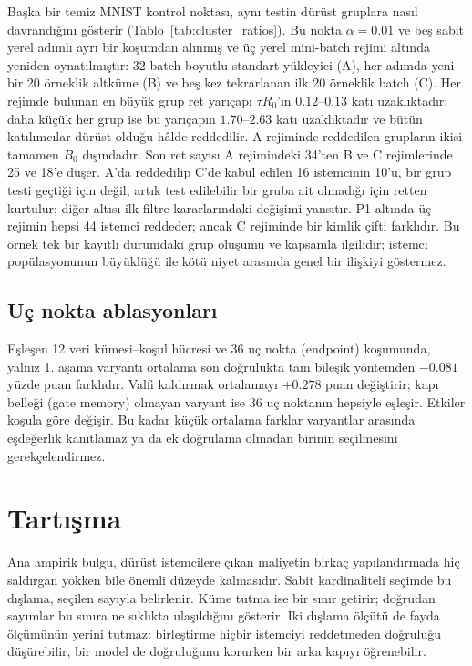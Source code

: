\documentclass[journal]{IEEEtran}
\begin{document}

Başka bir temiz MNIST kontrol noktası, aynı testin dürüst gruplara nasıl davrandığını gösterir (Tablo~\ref{tab:cluster_ratios}). Bu nokta $\alpha=0.01$ ve beş sabit yerel adımlı ayrı bir koşumdan alınmış ve üç yerel mini-batch rejimi altında yeniden oynatılmıştır: 32 batch boyutlu standart yükleyici (A), her adımda yeni bir 20 örneklik altküme (B) ve beş kez tekrarlanan ilk 20 örneklik batch (C). Her rejimde bulunan en büyük grup ret yarıçapı $\tau R_0$'ın $0.12$--$0.13$ katı uzaklıktadır; daha küçük her grup ise bu yarıçapın $1.70$--$2.63$ katı uzaklıktadır ve bütün katılımcılar dürüst olduğu hâlde reddedilir. A rejiminde reddedilen grupların ikisi tamamen $B_0$ dışındadır. Son ret sayısı A rejimindeki 34'ten B ve C rejimlerinde 25 ve 18'e düşer. A'da reddedilip C'de kabul edilen 16 istemcinin 10'u, bir grup testi geçtiği için değil, artık test edilebilir bir gruba ait olmadığı için retten kurtulur; diğer altısı ilk filtre kararlarındaki değişimi yansıtır. P1 altında üç rejimin hepsi 44 istemci reddeder; ancak C rejiminde bir kimlik çifti farklıdır. Bu örnek tek bir kayıtlı durumdaki grup oluşumu ve kapsamla ilgilidir; istemci popülasyonunun büyüklüğü ile kötü niyet arasında genel bir ilişkiyi göstermez.

\subsection{Uç nokta ablasyonları}

Eşleşen 12 veri kümesi--koşul hücresi ve 36 uç nokta (endpoint) koşumunda, yalnız 1. aşama varyantı ortalama son doğrulukta tam bileşik yöntemden $-0.081$ yüzde puan farklıdır. Valfi kaldırmak ortalamayı $+0.278$ puan değiştirir; kapı belleği (gate memory) olmayan varyant ise 36 uç noktanın hepsiyle eşleşir. Etkiler koşula göre değişir. Bu kadar küçük ortalama farklar varyantlar arasında eşdeğerlik kanıtlamaz ya da ek doğrulama olmadan birinin seçilmesini gerekçelendirmez.

\section{Tartışma}\label{sec:discussion}
Ana ampirik bulgu, dürüst istemcilere çıkan maliyetin birkaç yapılandırmada hiç saldırgan yokken bile önemli düzeyde kalmasıdır. Sabit kardinaliteli seçimde bu dışlama, seçilen sayıyla belirlenir. Küme tutma ise bir sınır getirir; doğrudan sayımlar bu sınıra ne sıklıkta ulaşıldığını gösterir. İki dışlama ölçütü de fayda ölçümünün yerini tutmaz: birleştirme hiçbir istemciyi reddetmeden doğruluğu düşürebilir, bir model de doğruluğunu korurken bir arka kapıyı öğrenebilir.
\end{document}
